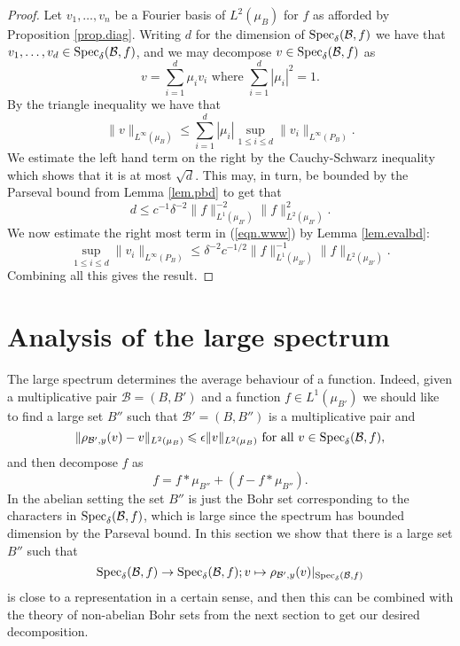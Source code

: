 \documentclass[12pt]{amsart}
\numberwithin{equation}{section}
\theoremstyle{plain}
\theoremstyle{definition}
\renewcommand{\leq}{\leqslant}
\providecommand{\Spec}{\mathop{\rm Spec}\nolimits}
\begin{document}
\begin{proof}
Let $v_1,\dots,v_n$ be a Fourier basis of $L^2(\mu_B)$ for $f$ as afforded by Proposition \ref{prop.diag}.  Writing $d$ for the dimension of $\Spec_{\delta}(\mathcal{B},f)$ we have that $v_1,\dots,v_d \in \Spec_{\delta}(\mathcal{B},f)$, and we may decompose $v \in \Spec_\delta(\mathcal{B},f)$ as
\begin{equation*}
v=\sum_{i=1}^d{\mu_iv_i} \textrm{ where } \sum_{i=1}^d{|\mu_i|^2}=1.
\end{equation*}
By the triangle inequality we have that
\begin{equation}\label{eqn.www}
\|v\|_{L^\infty(\mu_B)} \leq \sum_{i=1}^d{|\mu_i|}\sup_{1 \leq i \leq d}{\|v_i\|_{L^\infty(P_B)}}.
\end{equation}
We estimate the left hand term on the right by the Cauchy-Schwarz inequality which shows that it is at most $\sqrt{d}$.  This may, in turn, be bounded by the Parseval bound from Lemma \ref{lem.pbd} to get that
\begin{equation*}
d \leq c^{-1}\delta^{-2}\|f\|_{L^1(\mu_{B'})}^{-2}\|f\|_{L^2(\mu_{B'})}^2.
\end{equation*}
We now estimate the right most term in (\ref{eqn.www}) by Lemma \ref{lem.evalbd}:
\begin{equation*}
\sup_{1 \leq i \leq d}{\|v_i\|_{L^\infty(P_B)}} \leq \delta^{-2}c^{-1/2} \|f\|_{L^1(\mu_{B'})}^{-1}\|f\|_{L^2(\mu_{B'})}.
\end{equation*}
Combining all this gives the result.
\end{proof}

\section{Analysis of the large spectrum}\label{sec.anallarge}

The large spectrum determines the average behaviour of a function. Indeed, given a multiplicative pair $\mathcal{B}=(B,B')$ and a function $f \in L^1(\mu_{B'})$ we should like to find a large set $B''$ such that $\mathcal{B}'=(B,B'')$ is a multiplicative pair and
\begin{equation*}
\|\rho_{\mathcal{B}',y}(v) - v\|_{L^2(\mu_B)} \leq \epsilon \|v\|_{L^2(\mu_B)} \textrm{ for all }v \in \Spec_\delta(\mathcal{B},f),
\end{equation*}
and then decompose $f$ as
\begin{equation*}
f = f \ast \mu_{B''} + (f- f \ast \mu_{B''} ).
\end{equation*}
In the abelian setting the set $B''$ is just the Bohr set corresponding to the characters in $\Spec_\delta(\mathcal{B},f)$, which is large since the spectrum has bounded dimension by the Parseval bound.  In this section we show that there is a large set $B''$ such that
\begin{equation*}
\Spec_\delta(\mathcal{B},f)\rightarrow \Spec_\delta(\mathcal{B},f); v \mapsto \rho_{\mathcal{B}',y}(v)|_{\Spec_\delta(\mathcal{B},f)}
\end{equation*}
is close to a representation in a certain sense, and then this can be combined with the theory of non-abelian Bohr sets from the next section to get our desired decomposition.
\end{document}

